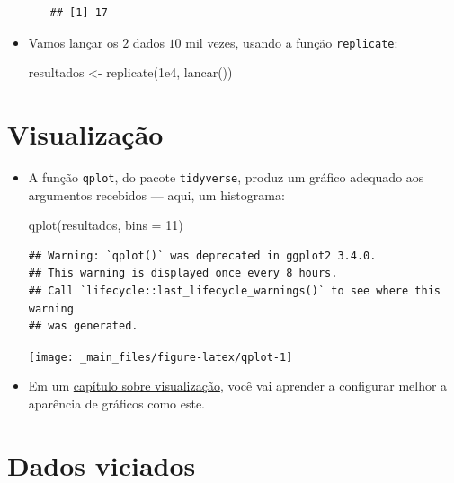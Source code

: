 \documentclass[
  11pt]{report}
\newenvironment{Shaded}{\begin{snugshade}}{\end{snugshade}}
\newcommand{\AttributeTok}[1]{\textcolor[rgb]{0.77,0.63,0.00}{#1}}
\newcommand{\DecValTok}[1]{\textcolor[rgb]{0.00,0.00,0.81}{#1}}
\newcommand{\FloatTok}[1]{\textcolor[rgb]{0.00,0.00,0.81}{#1}}
\newcommand{\FunctionTok}[1]{\textcolor[rgb]{0.00,0.00,0.00}{#1}}
\newcommand{\NormalTok}[1]{#1}
\newcommand{\OtherTok}[1]{\textcolor[rgb]{0.56,0.35,0.01}{#1}}
\renewenvironment{Shaded}{
    \begin{mdframed}[%
      roundcorner=2pt,%
      innerleftmargin=5pt,%
      innerrightmargin=5pt,%
      topline=true,%
      leftline=true,%
      rightline=true,%
      bottomline=true,%
      linewidth=0.5pt,%
      linecolor=black!20,%
      backgroundcolor=black!2,%
      skipabove=2ex,%
      skipbelow=2.5ex%
    ]%
  }
  {
    \end{mdframed}
  }
\begin{document}
\begin{itemize}
\begin{itemize}
\begin{verbatim}
## [1] 17
\end{verbatim}
  \end{itemize}
\item
  Vamos lançar os $2$ dados $10$ mil vezes, usando a função \texttt{replicate}:

\begin{Shaded}
\begin{Highlighting}[]
\NormalTok{resultados }\OtherTok{\textless{}{-}} \FunctionTok{replicate}\NormalTok{(}\FloatTok{1e4}\NormalTok{, }\FunctionTok{lancar}\NormalTok{())}
\end{Highlighting}
\end{Shaded}
\end{itemize}

\hypertarget{visualizauxe7uxe3o}{%
\section{Visualização}\label{visualizauxe7uxe3o}}

\begin{itemize}
\item
  A função \texttt{qplot}, do pacote \texttt{tidyverse}, produz um gráfico adequado aos argumentos recebidos --- aqui, um histograma:

\begin{Shaded}
\begin{Highlighting}[]
\FunctionTok{qplot}\NormalTok{(resultados, }\AttributeTok{bins =} \DecValTok{11}\NormalTok{)}
\end{Highlighting}
\end{Shaded}

\begin{verbatim}
## Warning: `qplot()` was deprecated in ggplot2 3.4.0.
## This warning is displayed once every 8 hours.
## Call `lifecycle::last_lifecycle_warnings()` to see where this warning
## was generated.
\end{verbatim}

  \begin{center}\texttt{[image: \_main\_files/figure-latex/qplot-1]} \end{center}
\item
  Em um \protect\hyperlink{viz}{capítulo sobre visualização}, você vai aprender a configurar melhor a aparência de gráficos como este.
\end{itemize}

\hypertarget{dados-viciados}{%
\section{Dados viciados}\label{dados-viciados}}
\end{document}
